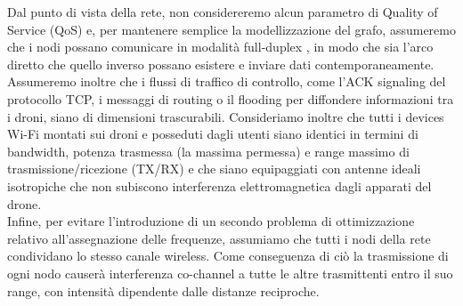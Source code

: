 Dal punto di vista della rete, non considereremo alcun parametro di Quality of Service (QoS) \cite{6686488} e, per mantenere semplice la modellizzazione del grafo, assumeremo che i nodi possano comunicare in modalità full-duplex \cite{6262501}, in modo che sia l'arco diretto che quello inverso possano esistere e inviare dati contemporaneamente. \\
Assumeremo inoltre che i flussi di traffico di controllo, come l'ACK signaling del protocollo TCP, i messaggi di routing o il flooding per diffondere informazioni tra i droni, siano di dimensioni trascurabili. 
Consideriamo inoltre che tutti i devices Wi-Fi montati sui droni e posseduti dagli utenti siano identici in termini di bandwidth, potenza trasmessa (la massima permessa) e range massimo di trasmissione/ricezione (TX/RX) e che siano equipaggiati con antenne ideali isotropiche \cite{zennaro2004radio} che non subiscono interferenza elettromagnetica dagli apparati del drone. \\
Infine, per evitare l'introduzione di un secondo problema di ottimizzazione relativo all'assegnazione delle frequenze, assumiamo che tutti i nodi della rete condividano lo stesso canale wireless. Come conseguenza di ciò la trasmissione di ogni nodo causerà interferenza co-channel \cite{arokiamary2009cellular} a tutte le altre trasmittenti entro il suo range, con intensità dipendente dalle distanze reciproche.
 






